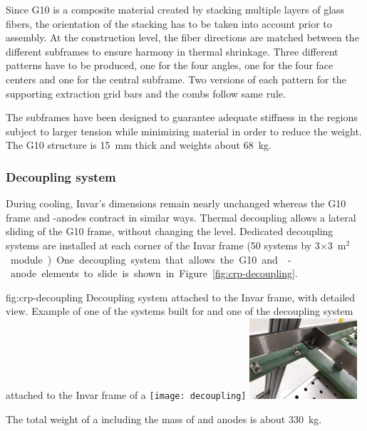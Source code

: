 Since G10 is a composite material created by stacking multiple layers of glass fibers,  the orientation of the stacking has to be taken into account prior to assembly.
At the construction level, the fiber directions are matched between the different subframes to ensure harmony in thermal shrinkage. Three different patterns have to be produced, one for the four angles, one for the four face centers and one for the central subframe.
Two versions of each pattern for the supporting extraction grid bars and the combs follow same rule.

The subframes have been designed to guarantee  
adequate stiffness in the  regions subject to larger tension while minimizing material in order to reduce the weight.
The G10 structure is \SI{15}{mm} thick and weights about \SI{68}{kg}. 

\subsubsection{Decoupling system}
 
During cooling, Invar's dimensions remain nearly unchanged whereas the G10 frame and -anodes contract in similar ways. Thermal decoupling allows a lateral sliding of the G10 frame, without changing the level. 
Dedicated decoupling systems are installed at each corner of the Invar frame (\num{50} systems by  \num{3}$\times$\SI{3}{m$^{2}$} module). One decoupling system that allows the G10 and -anode elements to slide is shown in  Figure~\ref{fig:crp-decoupling}.

\begin{dunefigure}{fig:crp-decoupling}
{Decoupling system attached to the Invar frame, with detailed view. Example of one of the systems built for  and one of the decoupling system attached to the Invar frame of a }
\texttt{[image: decoupling]}
\includegraphics[width=0.30\textwidth]{graphics/decoupling-crp}
\end{dunefigure}

The total weight of a  including the mass of  and anodes is about \SI{330}{kg}.

